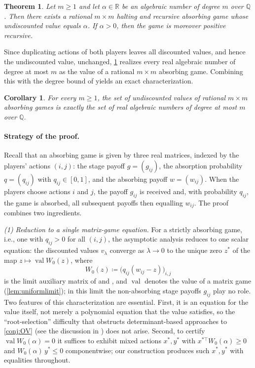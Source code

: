 \documentclass[11pt, a4paper]{article}
\theoremstyle{plain}
\newtheorem{theorem}{Theorem}
\newtheorem{corollary}{Corollary}
\theoremstyle{definition}
\newcommand{\Q}{\mathbb{Q}}
\newcommand{\R}{\mathbb{R}}
\DeclareMathOperator{\val}{val}
\newcommand{\defas}{\coloneqq}
\begin{document}
\begin{theorem}\label{thm:main-intro}
Let $m\geq 1$ and let $\alpha\in\R$ be an algebraic number of degree $m$ over $\Q$. Then there exists a rational $m\times m$ halting and recursive absorbing game whose undiscounted value equals $\alpha$. If $\alpha>0$, then the game is moreover positive recursive.
\end{theorem}

Since duplicating actions of both players leaves all discounted values, and hence the undiscounted value, unchanged, \cref{thm:main-intro} realizes every real algebraic number of degree at most $m$ as the value of a rational $m\times m$ absorbing game. Combining this with the degree bound of \citet{OB21} yields an exact characterization.

\begin{corollary}\label{cor:char-intro}
For every $m\geq 1$, the set of undiscounted values of rational $m\times m$ absorbing games is exactly the set of real algebraic numbers of degree at most $m$ over $\Q$.
\end{corollary}


\paragraph{Strategy of the proof.}
Recall that an absorbing game is given by three real matrices, indexed by the players' actions $(i,j)$: the stage payoff $g=(g_{ij})$, the absorption probability $q=(q_{ij})$ with $q_{ij}\in[0,1]$, and the absorbing payoff $w=(w_{ij})$. When the players choose actions $i$ and $j$, the payoff $g_{ij}$ is received and, with probability $q_{ij}$, the game is absorbed, all subsequent payoffs then equalling $w_{ij}$. The proof combines two ingredients.

\emph{(1) Reduction to a single matrix-game equation.}
For a strictly absorbing game, i.e., one with $q_{ij}>0$ for all $(i,j)$, the asymptotic analysis reduces to one scalar equation: the discounted values $v_\lambda$ converge as $\lambda\to0$ to the unique zero $z^*$ of the map $z\mapsto\val W_0(z)$, where
\[
W_0(z)\defas\bigl(q_{ij}(w_{ij}-z)\bigr)_{i,j}
\]
is the limit auxiliary matrix of \citet{AO19} and \citet{OV23}, and $\val$ denotes the value of a matrix game (\cref{lem:uniformlimit}); in this limit the non-absorbing stage payoffs $g_{ij}$ play no role. Two features of this characterization are essential. First, it is an equation for the value itself, not merely a polynomial equation that the value satisfies, so the ``root-selection'' difficulty that obstructs determinant-based approaches to \cref{conj:OV} (see the discussion in \citealp[Section~5]{OV23}) does not arise. Second, to certify $\val W_0(\alpha)=0$ it suffices to exhibit mixed actions $x^*,y^*$ with $x^{*\top}W_0(\alpha)\geq0$ and $W_0(\alpha)\,y^*\leq0$ componentwise; our construction produces such $x^*,y^*$ with equalities throughout.
\end{document}
